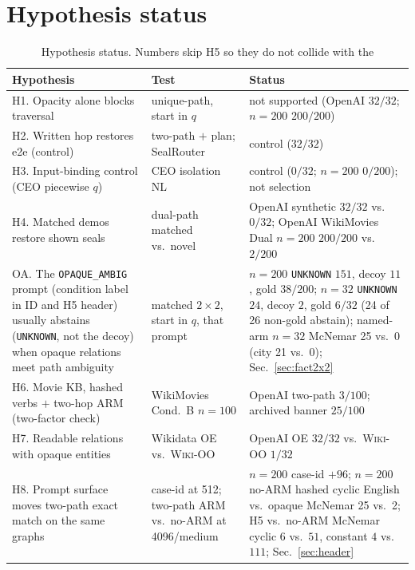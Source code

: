 \documentclass{article}
\begin{document}
\section{Hypothesis status}
\label{app:hyp}

\begin{table}[h]
\centering
\footnotesize
\setlength{\tabcolsep}{4pt}
\begin{tabularx}{\linewidth}{@{}
  >{\raggedright\arraybackslash}p{4.05cm}
  >{\raggedright\arraybackslash}X
  >{\raggedright\arraybackslash}p{4.05cm}@{}}
\toprule
Hypothesis & Test & Status \\
\midrule
H1. Opacity alone blocks traversal & unique-path, start in $q$ & not supported (OpenAI $32/32$; $n{=}200$ $200/200$) \\
H2. Written hop restores e2e (control) & two-path $+$ plan; SealRouter & control ($32/32$) \\
H3. Input-binding control (CEO piecewise $q$) & CEO isolation NL & control ($0/32$; $n{=}200$ $0/200$); not selection \\
H4. Matched demos restore shown seals & dual-path matched vs.\ novel & OpenAI synthetic $32/32$ vs.\ $0/32$; OpenAI WikiMovies Dual $n{=}200$ $200/200$ vs.\ $2/200$ \\
OA. The \texttt{OPAQUE\_AMBIG} prompt (condition label in ID and H5 header) usually abstains (\texttt{UNKNOWN}, not the decoy) when opaque relations meet path ambiguity & matched $2{\times}2$, start in $q$, that prompt & $n{=}200$ \texttt{UNKNOWN} $151$, decoy $11$, gold $38/200$; $n{=}32$ \texttt{UNKNOWN} $24$, decoy $2$, gold $6/32$ (24 of 26 non-gold abstain); named-arm $n{=}32$ McNemar 25 vs.\ 0 (city 21 vs.\ 0); Sec.~\ref{sec:fact2x2} \\
H6. Movie KB, hashed verbs $+$ two-hop ARM (two-factor check) & WikiMovies Cond.\ B $n{=}100$ & OpenAI two-path $3/100$; archived banner $25/100$ \\
H7. Readable relations with opaque entities & Wikidata OE vs.\ \textsc{Wiki-OO} & OpenAI OE $32/32$ vs.\ \textsc{Wiki-OO} $1/32$ \\
H8. Prompt surface moves two-path exact match on the same graphs & case-id at 512; two-path ARM vs.\ no-ARM at 4096/medium & $n{=}200$ case-id ${+}96$; $n{=}200$ no-ARM hashed cyclic English vs.\ opaque McNemar 25 vs.\ 2; H5 vs.\ no-ARM McNemar cyclic $6$ vs.\ $51$, constant $4$ vs.\ $111$; Sec.~\ref{sec:header} \\
\bottomrule
\end{tabularx}
\caption{Hypothesis status. Numbers skip H5 so they do not collide with the
}
\end{table}
\end{document}
